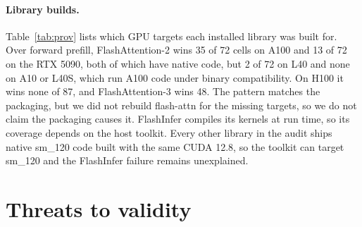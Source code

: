 \documentclass[11pt]{article}
\newcommand{\code}[1]{\texttt{\small #1}}
\begin{document}
\paragraph{Library builds.} Table~\ref{tab:prov} lists which GPU targets each
installed library was built for. Over forward prefill, FlashAttention-2 wins 35
of 72 cells on A100 and 13 of 72 on the RTX 5090, both of which have native
code, but 2 of 72 on L40 and none on A10 or L40S, which run A100 code under
binary compatibility. On H100 it wins none of 87, and FlashAttention-3 wins 48.
The pattern matches the packaging, but we did not rebuild flash-attn for the
missing targets, so we do not claim the packaging causes it. FlashInfer
compiles its kernels at run time, so its coverage depends on the host toolkit.
Every other library in the audit ships native sm\_120 code built with the same
CUDA 12.8, so the toolkit can target sm\_120 and the FlashInfer failure remains
unexplained.

\begin{table}[tb]
\centering
\small
\setlength{\tabcolsep}{3pt}
\caption{GPU targets in the installed libraries, from \code{cuobjdump}. SASS
means native code for that architecture is present. An italic number means no
native code shipped and the GPU runs code built for that older architecture,
which CUDA allows within one major compute capability. \emph{PTX} is the
embedded PTX the driver can compile for newer GPUs. JIT means the library
compiles its kernels at run time, and \emph{none} means no kernel was produced
for that target.}
\label{tab:prov}
\end{table}

\section{Threats to validity}
\label{sec:threats}
\end{document}
